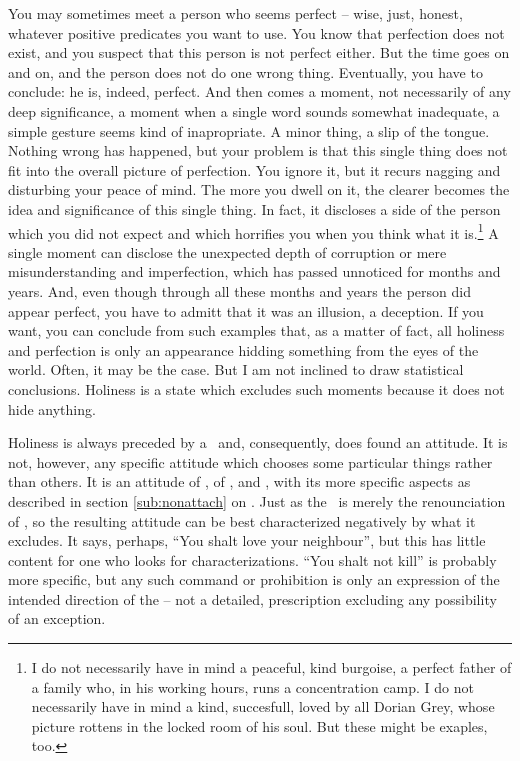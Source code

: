{\pa
You may sometimes meet a person who seems perfect -- wise, just, 
honest, whatever positive predicates you want to use. You know that 
perfection does not exist, and you suspect that this person is not 
perfect either. But the time goes on and on, and the person does not 
do one wrong thing. Eventually, you have to conclude: he is, indeed, 
perfect. And then comes a moment, not necessarily of any deep 
significance, a moment when a single word sounds somewhat inadequate, 
a simple gesture seems kind of inapropriate. 
A minor thing, a slip of the tongue. Nothing wrong has happened, but 
your problem is that this single thing does not fit into the overall 
picture of perfection. You ignore it, but it recurs nagging and 
disturbing your peace of mind. The more you dwell on it, the clearer 
becomes the idea and significance of this single thing. In fact, 
it discloses a side of the person which you did not expect and which 
horrifies you when you think what it is.\footnote{I do not 
necessarily have in mind a peaceful, kind burgoise, a perfect father 
of a family who, in his working hours, runs a concentration camp. I 
do not necessarily have in mind a kind, succesfull, loved by all 
Dorian Grey, whose picture rottens in the locked room of his soul. 
But these might be exaples, too.} A single moment can disclose the 
unexpected depth of corruption or mere misunderstanding and 
imperfection, which has passed unnoticed for months and years. And, 
even though through all these months and years the person did appear 
perfect, you have to admitt that it was an illusion, a deception. If 
you want, you can conclude from such examples that, as a matter of 
fact, all holiness and perfection is only an appearance hidding 
something from the eyes of the world. Often, it may be the case. But 
I am not inclined to draw statistical conclusions. Holiness is a 
state which excludes such moments because it does not hide anything. 

\pa Holiness is always preceded by a \sch\ and,
consequently, does found an attitude.  It is not, however, 
any specific attitude which chooses some particular things rather than
others.  It is an attitude of , of ,
 and , with its more specific aspects as
described in section \ref{sub:nonattach} on .  Just
as the \yes\ is merely the renounciation of , so the
resulting attitude can be best characterized negatively by what it
excludes.  It says, perhaps, ``You shalt love your neighbour'', but
this has little content for one who looks for 
characterizations.  ``You shalt not kill'' is probably more specific,
but any such command or prohibition is only an expression of the
intended direction of the  -- not a detailed, 
prescription excluding any possibility of an exception. 

}
